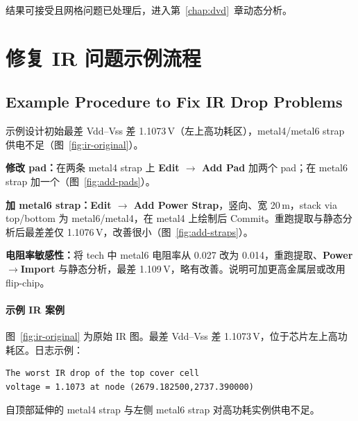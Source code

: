 \label{fig:ir-instance}
\label{fig:ir-color-range}
\label{fig:ir-zoom}

结果可接受且网格问题已处理后，进入第~\ref{chap:dvd}~章动态分析。

\section{修复 IR 问题示例流程}
\subsection*{Example Procedure to Fix IR Drop Problems}

示例设计初始最差 Vdd--Vss 差 1.1073\,V（左上高功耗区），metal4/metal6 strap 供电不足（图~\ref{fig:ir-original}）。

\label{fig:ir-original}

\textbf{修改 pad：}在两条 metal4 strap 上 \textbf{Edit $\rightarrow$ Add Pad} 加两个 pad；在 metal6 strap 加一个（图~\ref{fig:add-pads}）。

\label{fig:add-pads}

\textbf{加 metal6 strap：}\textbf{Edit $\rightarrow$ Add Power Strap}，竖向、宽 20\,\textmu m，stack via top/bottom 为 metal6/metal4，在 metal4 上绘制后 Commit。重跑提取与静态分析后最差差仅 1.1076\,V，改善很小（图~\ref{fig:add-straps}）。

\label{fig:add-straps}

\textbf{电阻率敏感性：}将 tech 中 metal6 电阻率从 0.027 改为 0.014，重跑提取、\textbf{Power$\rightarrow$Import} 与静态分析，最差 1.109\,V，略有改善。说明可加更高金属层或改用 flip-chip。
\paragraph{示例 IR 案例}
图~\ref{fig:ir-original} 为原始 IR 图。最差 Vdd--Vss 差 1.1073\,V，位于芯片左上高功耗区。日志示例：
\begin{lstlisting}
The worst IR drop of the top cover cell
voltage = 1.1073 at node (2679.182500,2737.390000)
\end{lstlisting}
自顶部延伸的 metal4 strap 与左侧 metal6 strap 对高功耗实例供电不足。

